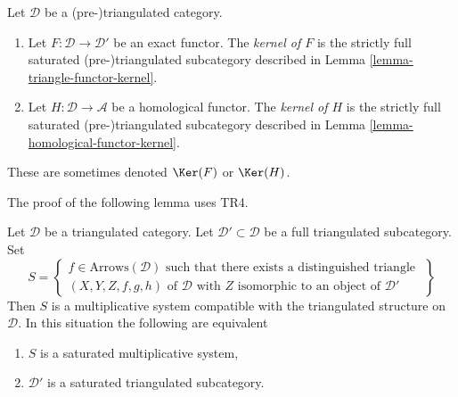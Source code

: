 \begin{definition}
\label{definition-kernel-category}
Let $\mathcal{D}$ be a (pre-)triangulated category.
\begin{enumerate}
\item Let $F : \mathcal{D} \to \mathcal{D}'$ be an exact functor.
The {\it kernel of $F$} is the strictly full saturated
(pre-)triangulated subcategory described in
Lemma \ref{lemma-triangle-functor-kernel}.
\item Let $H : \mathcal{D} \to \mathcal{A}$ be a homological functor.
The {\it kernel of $H$} is the strictly full saturated
(pre-)triangulated subcategory described in
Lemma \ref{lemma-homological-functor-kernel}.
\end{enumerate}
These are sometimes denoted $\Ker(F)$ or $\Ker(H)$.
\end{definition}

\noindent
The proof of the following lemma uses TR4.

\begin{lemma}
\label{lemma-construct-multiplicative-system}
Let $\mathcal{D}$ be a triangulated category.
Let $\mathcal{D}' \subset \mathcal{D}$ be a full triangulated
subcategory. Set
\begin{equation}
\label{equation-multiplicative-system}
S =
\left\{
\begin{matrix}
f \in \text{Arrows}(\mathcal{D})
\text{ such that there exists a distinguished triangle }\\
(X, Y, Z, f, g, h) \text{ of }\mathcal{D}\text{ with }
Z\text{ isomorphic to an object of }\mathcal{D}'
\end{matrix}
\right\}
\end{equation}
Then $S$ is a multiplicative system compatible with the triangulated
structure on $\mathcal{D}$. In this situation the following are equivalent
\begin{enumerate}
\item $S$ is a saturated multiplicative system,
\item $\mathcal{D}'$ is a saturated triangulated subcategory.
\end{enumerate}
\end{lemma}

